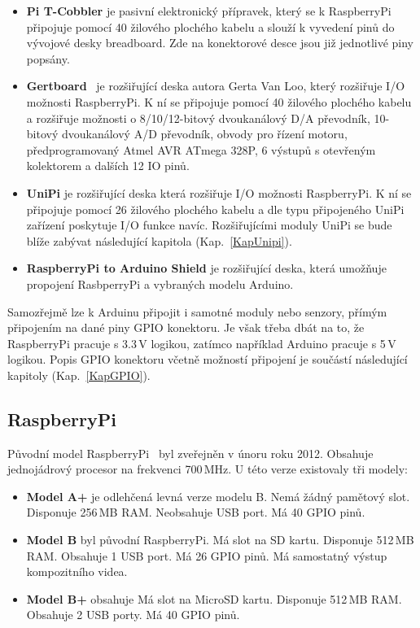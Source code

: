 \begin{itemize}
	\item \textbf{Pi T-Cobbler} je pasivní elektronický přípravek, který se k RaspberryPi připojuje pomocí 40 žilového plochého kabelu a slouží k vyvedení pinů do vývojové desky breadboard. Zde na konektorové desce jsou již jednotlivé piny popsány.
\item \textbf{Gertboard}~\cite{GertBoard} je rozšiřující deska autora Gerta Van Loo, který rozšiřuje I/O možnosti RaspberryPi. K ní se připojuje pomocí 40 žilového plochého kabelu a rozšiřuje možnosti o 8/10/12-bitový dvoukanálový D/A převodník, 10-bitový dvoukanálový A/D převodník, obvody pro řízení motoru, předprogramovaný Atmel AVR ATmega 328P, 6 výstupů s otevřeným kolektorem a dalších 12 IO pinů. 
\item \textbf{UniPi} je rozšiřující deska která rozšiřuje I/O možnosti RaspberryPi. K ní se připojuje pomocí 26 žilového plochého kabelu a dle typu připojeného UniPi zařízení poskytuje I/O funkce navíc. Rozšiřujícími moduly UniPi se bude blíže zabývat následující kapitola (Kap.~\ref{KapUnipi}).
\item \textbf{RaspberryPi to Arduino Shield} je rozšiřující deska, která umožňuje propojení RasbperryPi a vybraných modelu Arduino.
\end{itemize}
Samozřejmě lze k Arduinu připojit i samotné moduly nebo senzory, přímým připojením na dané piny GPIO konektoru. Je však třeba dbát na to, že RaspberryPi pracuje s 3.3\,V logikou, zatímco například Arduino pracuje s 5\,V logikou. Popis GPIO konektoru včetně možností připojení je součástí následující kapitoly (Kap.~\ref{KapGPIO}).

	\subsection{RaspberryPi}
	Původní model RaspberryPi~\cite{RaspiOne} byl zveřejněn v únoru roku 2012. Obsahuje jednojádrový procesor na frekvenci 700\,MHz. U této verze existovaly tři modely:
	
		\begin{itemize}
		\item \textbf{Model A+} je odlehčená levná verze modelu B. Nemá žádný pamětový slot. Disponuje 256\,MB RAM. Neobsahuje USB port. Má 40 GPIO pinů.
		\item \textbf{Model B} byl původní RaspberryPi. Má slot na SD kartu. Disponuje 512\,MB RAM. Obsahuje 1 USB port. Má 26 GPIO pinů. Má samostatný výstup kompozitního videa.
		\item \textbf{Model B+} obsahuje   Má slot na MicroSD kartu. Disponuje 512\,MB RAM. Obsahuje 2 USB porty. Má 40 GPIO pinů.
	\end{itemize}
	
